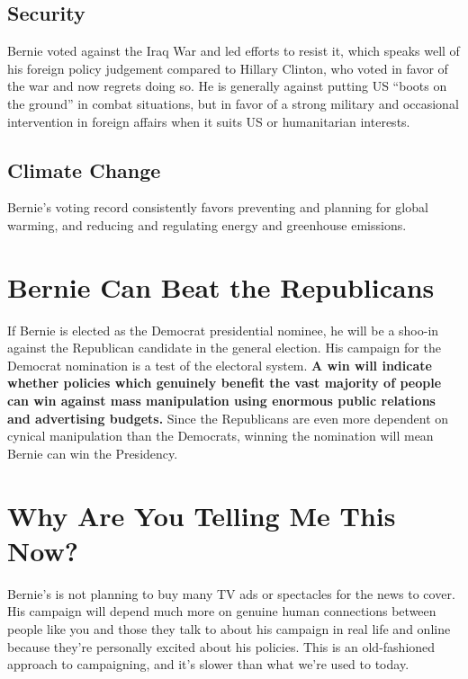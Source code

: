 \documentclass[notumble]{leaflet}
\begin{document}
\subsection*{Security}
Bernie voted against the Iraq War and led efforts to resist it, which
speaks well of his foreign policy judgement compared to Hillary
Clinton, who voted in favor of the war and now regrets doing so.  He
is generally against putting US ``boots on the ground'' in combat
situations, but in favor of a strong military and occasional
intervention in foreign affairs when it suits US or humanitarian
interests.

\subsection*{Climate Change}

Bernie's voting record consistently favors preventing and planning for
global warming, and reducing and regulating energy and greenhouse
emissions.

\section*{Bernie Can Beat the Republicans}

If Bernie is elected as the Democrat presidential nominee, he will be
a shoo-in against the Republican candidate in the general election.
His campaign for the Democrat nomination is a test of the electoral
system.  {\bf A win will indicate whether policies which
  genuinely benefit the vast majority of people can win against mass
  manipulation using enormous public relations and advertising
  budgets.}  Since the Republicans are even more dependent on cynical
manipulation than the Democrats, winning the nomination will mean
Bernie can win the Presidency.

\section*{Why Are You Telling Me This Now?}

Bernie's is not planning to buy many TV ads or spectacles for the news
to cover.  His campaign will depend much more on genuine human
connections between people like you and those they talk to about his
campaign in real life and online because they're personally excited
about his policies.  This is an old-fashioned approach to campaigning,
and it's slower than what we're used to today.
\end{document}
